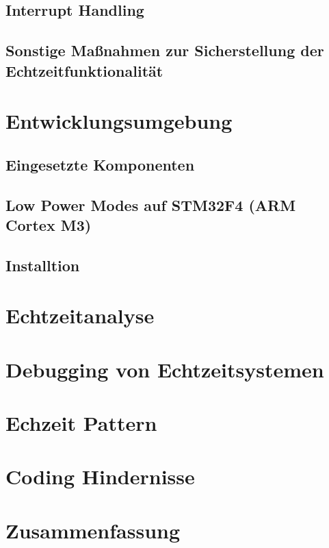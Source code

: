\documentclass[ngerman]{seminarvorlage}
\begin{document}
\subsection{Interrupt Handling}
\subsection{Sonstige Maßnahmen zur Sicherstellung der Echtzeitfunktionalität}

\section{Entwicklungsumgebung}
\subsection{Eingesetzte Komponenten}
\subsection{Low Power Modes auf STM32F4 (ARM Cortex M3)}
\label{sec:Low Power Modes} 

\subsection{Installtion}

\section{Echtzeitanalyse}
\label{sec:Echtzeitanalyse} 
\section{Debugging von Echtzeitsystemen} 
\section{Echzeit Pattern} 
\section{Coding Hindernisse} 
\section{Zusammenfassung}
\pagebreak
\end{document}
